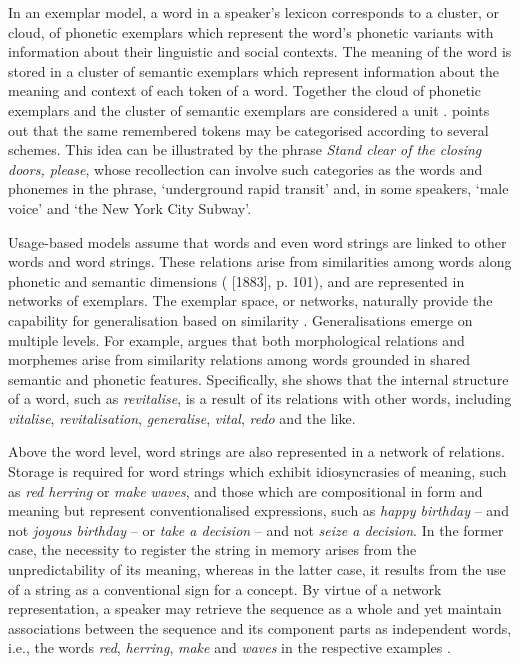 In an exemplar model, a word in a speaker's lexicon corresponds to a cluster, or cloud, of phonetic exemplars which represent the word's phonetic variants with information about their linguistic and social contexts. The meaning of the word is stored in a cluster of semantic exemplars which represent information about the meaning and context of each token of a word. Together the cloud of phonetic exemplars and the cluster of semantic exemplars are considered a unit \citep[for an overview and further details, see][]{bybee-beckner-2009, bybee-book-2010}. \citet{pierrehumbert-2001} points out that the same remembered tokens may be categorised according to several schemes. This idea can be illustrated by the phrase \textit{Stand clear of the closing doors, please}, whose recollection can involve such categories as the words and phonemes in the phrase, `underground rapid transit' and, in some speakers, `male voice' and `the New York City Subway'.

Usage-based models assume that words and even word strings are linked to other words and word strings. These relations arise from similarities among words along phonetic and semantic dimensions (\citealt{kruszewski} [1883], p. 101), and are represented in networks of exemplars. The exemplar space, or networks, naturally provide the capability for generalisation based on similarity \citep[cf.][]{pierrehumbert-2002}. Generalisations emerge on multiple levels. For example, \citet{bybee-morphology-1985, bybee-book-2010, bybee-word-2002} argues that both morphological relations and morphemes arise from similarity relations among words grounded in shared semantic and phonetic features. Specifically, she shows that the internal structure of a word, such as \textit{revitalise}, is a result of its relations with other words, including \textit{vitalise}, \textit{revitalisation}, \textit{generalise}, \textit{vital}, \textit{redo} and the like. 

Above the word level, word strings are also represented in a network of relations. Storage is required for word strings which exhibit idiosyncrasies of meaning, such as \textit{red herring} or \textit{make waves}, and those which are compositional in form and meaning but represent conventionalised expressions, such as \textit{happy birthday} -- and not \textit{joyous birthday} -- or \textit{take a decision} -- and not \textit{seize a decision}. In the former case, the necessity to register the string in memory arises from the unpredictability of its meaning, whereas in the latter case, it results from the use of a string as a conventional sign for a concept. By virtue of a network representation, a speaker may retrieve the sequence as a whole and yet maintain associations between the sequence and its component parts as independent words, i.e., the words \textit{red}, \textit{herring}, \textit{make} and \textit{waves} in the respective examples \citep[cf.][25]{bybee-book-2010}. 

